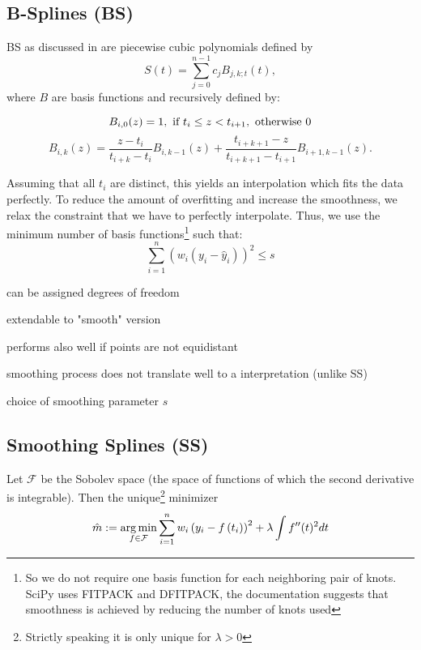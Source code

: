 	\subsection{B-Splines (BS)}
		\label{sec:B}
		BS as discussed in \cite{lycheSplineMethods2005} are piecewise cubic polynomials defined by 
		$$
			S(t)=\sum_{j=0}^{n-1} c_{j} B_{j, k ; t}(t),
		$$
		where $B$ are basis functions and recursively defined by:
		
		\begin{equation}
				B_{i, 0}(z)=1, \text { if } t_{i} \leq z<t_{i+1}, \text { otherwise } 0 \\
		\end{equation}
		\begin{equation}
			B_{i, k}(z)=\frac{z-t_{i}}{t_{i+k}-t_{i}} B_{i, k-1}(z)+\frac{t_{i+k+1}-z}{t_{i+k+1}-t_{i+1}} B_{i+1, k-1}(z).
		\end{equation}
		
		Assuming that all $t_i$ are distinct, this yields an interpolation which fits the data perfectly. To reduce the amount of overfitting and increase the smoothness, we relax the constraint that we have to perfectly interpolate. Thus, we use the minimum number of basis functions\footnote{So we do not require one basis function for each neighboring pair of knots. SciPy uses FITPACK and DFITPACK, the documentation suggests that smoothness is achieved by reducing the number of knots used} such that:
		$$\sum_{i=1}^n(w_i (y_i - \hat y_i))^2 \leq s$$

		\begin{my_pros_cons_table}{
				\item can be assigned degrees of freedom
				\item extendable to "smooth" version
				\item performs also well if points are not equidistant
			}{
				\item smoothing process does not translate well to a interpretation (unlike SS)
				\item choice of smoothing parameter $s$
			}
		\end{my_pros_cons_table}


	\subsection{Smoothing Splines (SS)}
		\label{sec:Natural_SS}
		Let $\mathcal F$ be the Sobolev space (the space of functions of which the second derivative is integrable). Then the unique\footnote{Strictly speaking it is only unique for $\lambda > 0$} minimizer
		\begin{equation}
			\label{eq:ss}
			\hat m :=\operatorname*{arg\, min}_{f \in \mathcal F} \sum_{i=1}^{n}w_i\left(y_{i}-{f}\left(t_{i}\right)\right)^{2}+\lambda \int {f}^{\prime \prime}(t)^{2} dt
		\end{equation}
			
